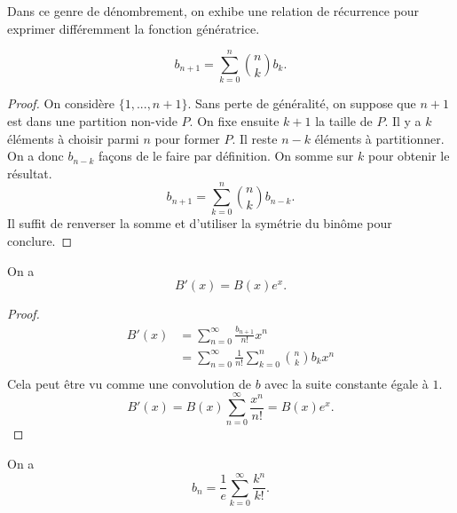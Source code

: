 \documentclass[../main.tex]{subfiles}
\begin{document}
Dans ce genre de dénombrement, on exhibe une relation de récurrence pour exprimer différemment
la fonction génératrice.
\begin{proposition}
    \begin{equation}
        b_{n+1} = \sum_{k=0}^n \binom{n}{k}b_k.
    \end{equation}
\end{proposition}
\begin{proof}
    On considère \(\{1,...,n+1\}\). Sans perte de généralité, on suppose que \(n+1\) est 
    dans une partition non-vide \(P\). On fixe ensuite \(k+1\) la taille de \(P\). Il y a
    \(k\) éléments à choisir parmi \(n\) pour former \(P\). Il reste \(n-k\) éléments à
    partitionner. On a donc \(b_{n-k}\) façons de le faire par définition. On somme
    sur \(k\) pour obtenir le résultat.
    \begin{equation}
        b_{n+1} = \sum_{k=0}^n \binom{n}{k}b_{n-k}.
    \end{equation}
    Il suffit de renverser la somme et d'utiliser la symétrie du binôme pour conclure.
\end{proof}
\begin{proposition} On a 
    \begin{equation}
        B'(x) = B(x)e^x.
    \end{equation}
\end{proposition}
\begin{proof}
    \begin{align}
        B'(x) & = \sum_{n=0}^{\infty}\frac{b_{n+1}}{n!}x^n\\
        & = \sum_{n=0}^{\infty}\frac{1}{n!}\sum_{k=0}^n \binom{n}{k}b_kx^n\\
    \end{align}
    Cela peut être vu comme une convolution de \(b\) avec la suite constante égale à \(1\).
    \begin{equation}
        B'(x) = B(x)\sum_{n=0}^{\infty}\frac{x^n}{n!} = B(x)e^x.
    \end{equation}
\end{proof}
\begin{theorem} On a 
    \begin{equation}
        b_n = \frac{1}{e}\sum_{k=0}^{\infty}\frac{k^n}{k!}.
    \end{equation}
\end{theorem}
\end{document}
